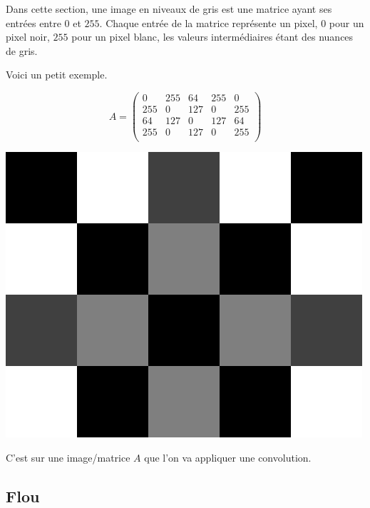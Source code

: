 \documentclass[11pt,class=report,crop=false]{standalone}
\begin{document}
Dans cette section, une image en niveaux de gris est une matrice ayant ses entrées entre $0$ et $255$. Chaque entrée de la matrice représente un pixel, $0$ pour un pixel noir, $255$ pour un pixel blanc, les valeurs intermédiaires étant des nuances de gris.

Voici un petit exemple.
\begin{center}
\begin{minipage}{0.5\textwidth}
$$A = \begin{pmatrix}
  0& 255&  64& 255&   0 \\
255&   0& 127&   0& 255 \\
 64& 127&   0& 127&  64 \\
255&   0& 127&   0& 255 \\
\end{pmatrix}$$
\end{minipage}	
\begin{minipage}{0.4\textwidth}
\includegraphics[scale=\myscale,scale=1]{figures/ecran-cours-image-new}
\end{minipage}
\end{center}
C'est sur une image/matrice $A$ que l'on va appliquer une convolution.

\subsection{Flou}


\end{document}
